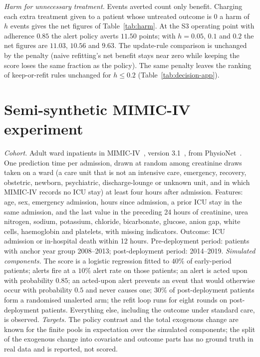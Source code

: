 \documentclass[letterpaper]{article} %
\begin{document}



\emph{Harm for unnecessary treatment.} Events averted count only benefit.
Charging each extra treatment given to a patient whose untreated outcome is 0
a harm of $h$ events gives the net figures of Table~\ref{tab:harm}.
At the S3 operating point with adherence $0.85$ the alert policy averts $11.50$ points; with $h = 0.05$, $0.1$ and $0.2$ the net figures are $11.03$, $10.56$ and $9.63$. The update-rule comparison is unchanged by the penalty (naive refitting's net benefit stays near zero while keeping the score loses the same fraction as the policy). The same penalty leaves the ranking of keep-or-refit rules unchanged for
$h \le 0.2$ (Table~\ref{tab:decision-app}).



\section{Semi-synthetic MIMIC-IV experiment}
\label{app:mimic}
\emph{Cohort.} Adult ward inpatients in MIMIC-IV~\citep{johnson2023mimic},
version 3.1~\citep{johnson2024mimiciv}, from
PhysioNet~\citep{goldberger2000physionet}.
One prediction time per admission, drawn at random among creatinine draws
taken on a ward (a care unit that is not an intensive care, emergency,
recovery, obstetric, newborn, psychiatric, discharge-lounge or unknown unit,
and in which MIMIC-IV records no ICU stay) at least four hours after
admission. Features: age, sex, emergency admission, hours since admission, a
prior ICU stay in the same admission, and the last value in the preceding
24 hours of creatinine, urea nitrogen, sodium, potassium, chloride,
bicarbonate, glucose, anion gap, white cells, haemoglobin and platelets, with
missing indicators. Outcome: ICU admission or in-hospital death within
12 hours. Pre-deployment period: patients with anchor year group 2008--2013;
post-deployment period: 2014--2019.
\emph{Simulated components.} The score is a logistic regression fitted to
$40\%$ of early-period patients; alerts fire at a $10\%$ alert rate on those
patients; an alert is acted upon with probability $0.85$; an acted-upon alert
prevents an event that would otherwise occur with probability $0.5$ and never
causes one; $30\%$ of post-deployment patients form a randomised unalerted
arm; the refit loop runs for eight rounds on post-deployment patients.
Everything else, including the outcome under standard care, is observed.
\emph{Targets.} The policy contrast and the total exogenous change are known
for the finite pools in expectation over the simulated components; the split
of the exogenous change into covariate and outcome parts has no ground truth
in real data and is reported, not scored.
\end{document}
